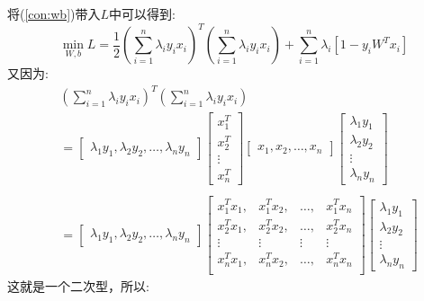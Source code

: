 \documentclass[withoutpreface,bwprint]{cumcmthesis} %
\begin{document}
	将(\ref{con:wb})带入$L$中可以得到:
	\begin{equation}
		\mathop{min} \limits_{W,b} L=\dfrac{1}{2}(\sum_{i=1}^{n}\lambda_i y_i x_i)^T (\sum_{i=1}^{n}\lambda_i y_i x_i)+\sum_{i=1}^{n}\lambda_i \left[1-y_iW^Tx_i  \right]
	\end{equation}
	又因为:
	\begin{align*}
		& (\sum_{i=1}^{n}\lambda_i y_i x_i)^T (\sum_{i=1}^{n}\lambda_i y_i x_i)
		\\&=
		\left[
		\begin{array}{cccc}
			\lambda_1 y_1,\lambda_2 y_2,\ldots,\lambda_n y_n
		\end{array}
		\right] \left[
			\begin{array}{c}
				x_1^T \\
				x_2^T \\
				\vdots \\
				x_n^T
			\end{array}
		\right] \left[
		\begin{array}{cccc}
			x_1,x_2,\ldots,x_n
		\end{array}
		\right] \left[
			\begin{array}{c}
				\lambda_1 y_1\\
				\lambda_2 y_2\\
				\vdots\\
				\lambda_n y_n
			\end{array}
		\right]
		\\\\
		&=
			\left[
		\begin{array}{cccc}
			\lambda_1 y_1,\lambda_2 y_2,\ldots,\lambda_n y_n
		\end{array}
		\right] 
		\left[
			\begin{array}{cccc}
				x_1^Tx_1,&x_1^Tx_2,&\ldots,&x_1^T x_n\\
				x_2^Tx_1,&x_2^Tx_2,&\ldots,&x_2^T x_n\\
				\vdots &\vdots &\vdots &\vdots \\
				x_n^Tx_1,&x_n^Tx_2,&\ldots,&x_n^T x_n\\	
			\end{array}
		\right]
		 \left[
		\begin{array}{c}
			\lambda_1 y_1\\
			\lambda_2 y_2\\
			\vdots\\
			\lambda_n y_n
		\end{array}
		\right]				
	\end{align*}
	这就是一个二次型，所以:
\end{document}
